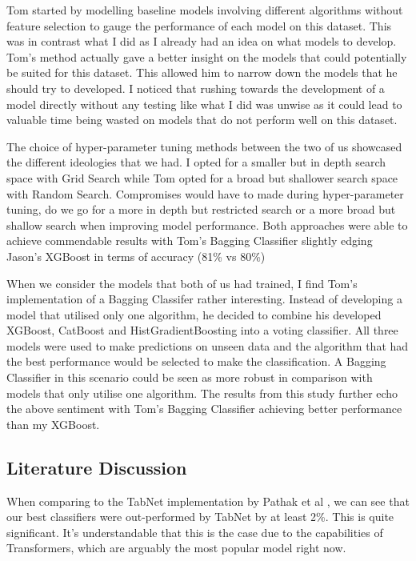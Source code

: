 \documentclass[conference]{IEEEtran}
\begin{document}
Tom started by modelling baseline models involving different algorithms without feature selection to gauge the performance of each model on this dataset. This was in contrast what I did as I already had an idea on what models to develop. Tom's method actually gave a better insight on the models that could potentially be suited for this dataset. This allowed him to narrow down the models that he should try to developed. I noticed that rushing towards the development of a model directly without any testing like what I did was unwise as it could lead to valuable time being wasted on models that do not perform well on this dataset.

The choice of hyper-parameter tuning methods between the two of us showcased the different ideologies that we had. I opted for a smaller but in depth search space with Grid Search while Tom opted for a broad but shallower search space with Random Search. Compromises would have to made during hyper-parameter tuning, do we go for a more in depth but restricted search or a more broad but shallow search when improving model performance. Both approaches were able to achieve commendable results with Tom's Bagging Classifier slightly edging Jason's XGBoost in terms of accuracy (81\% vs 80\%)

When we consider the models that both of us had trained, I find Tom's implementation of a Bagging Classifer rather interesting. Instead of developing a model that utilised only one algorithm, he decided to combine his developed XGBoost, CatBoost and HistGradientBoosting into a voting classifier. All three models were used to make predictions on unseen data and the algorithm that had the best performance would be selected to make the classification. A Bagging Classifier in this scenario could be seen as more robust in comparison with models that only  utilise one algorithm. The results from this study further echo the above sentiment with Tom's Bagging Classifier achieving better performance than my XGBoost.

\subsection{Literature Discussion}

When comparing to the TabNet implementation by Pathak et al \cite{pathak2023pump}, we can see that our best classifiers were out-performed by TabNet by at least 2\%. This is quite significant. It's understandable that this is the case due to the capabilities of Transformers, which are arguably the most popular model right now. 
\end{document}
